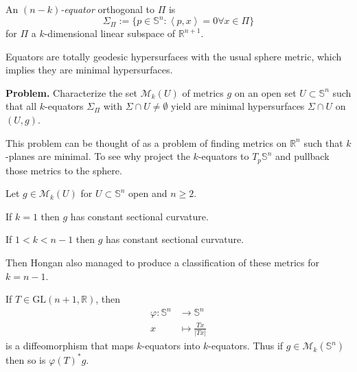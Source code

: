 \begin{definition}
\label{definition-equator}
An {\it $(n-k)$-equator} orthogonal to $\Pi$ is
$$
\Sigma_\Pi:=\{p\in\mathbb{S}^n:\left<p,x\right>=0\forall x\in\Pi\}
$$
for $\Pi$ a $k$-dimensional linear subspace of $\mathbb{R}^{n+1}$.
\end{definition}

\begin{remark}
\label{remark-equators-are-totally-geodesic-with-usual-metric}
Equators are totally geodesic hypersurfaces with the usual sphere metric, which
implies they are minimal hypersurfaces.
\end{remark}

{\bf Problem.} Characterize the set $\mathcal{M}_k(U)$ of metrics $g$ on an 
open set $U\subset\mathbb{S}^n$ such that all $k$-equators $\Sigma_\Pi$ with
 $\Sigma\cap U\neq\emptyset$ yield are minimal hypersurfaces $\Sigma\cap U$ 
on $(U,g)$.

\begin{remark}
\label{remark-why-not-Rn}
This problem can be thought of as a problem of finding metrics on $\mathbb{R}^n$
such that $k$-planes are minimal. To see why project the $k$-equators to
$T_p\mathbb{S}^n$ and pullback those metrics to the sphere.
\end{remark}

\medskip\noindent

Let $g\in\mathcal{M}_k(U)$ for $U\subset\mathbb{S}^n$ open and $n\geq 2$.

\begin{theorem}
\label{theorem-Beltrami-Schafli}
If $k=1$ then $g$ has constant sectional curvature.
\end{theorem}

\begin{theorem}[Hongan]
\label{theorem-Hongan}
If $1<k<n-1$ then $g$ has constant sectional curvature.
\end{theorem}

Then Hongan also managed to produce a classification of these metrics for
$k=n-1$.

\begin{remark}
\label{remark-linear-invertible-preserving-equators-is-in-Mg}
If $T\in \text{GL}(n+1,\mathbb{R})$, then
\begin{align*}
\varphi: \mathbb{S}^n &\longrightarrow \mathbb{S}^n \\
x &\longmapsto \frac{Tx}{|Tx|}
\end{align*}
is a diffeomorphism that maps $k$-equators into $k$-equators. Thus if
$g\in\mathcal{M}_k(\mathbb{S}^n)$ then so is $\varphi(T)^*g$.
\end{remark}

